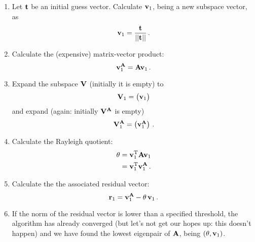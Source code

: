         \begin{enumerate}
            \item Let $\vb{t}$ be an initial guess vector. Calculate $\vb{v}_1$, being a new subspace vector, as
                \begin{equation}
                    \vb{v}_1 = \frac{\vb{t}}{|| \vb{t} ||} \thinspace .
                \end{equation}

            \item Calculate the (expensive) matrix-vector product:
                \begin{equation}
                    \vb{v}^{\vb{A}}_1 = \vb{A} \vb{v}_1 \thinspace .
                \end{equation}

            \item Expand the subspace $\vb{V}$ (initially it is empty) to
                \begin{equation}
                    \vb{V}_1 = \begin{pmatrix} \vb{v}_1 \end{pmatrix}
                \end{equation}
                and expand (again: initially $\vb{V}^{\vb{A}}$ is empty)
                \begin{equation}
                    \vb{V}^{\vb{A}}_1 = \begin{pmatrix} \vb{v}^{\vb{A}}_1 \end{pmatrix} \thinspace .
                \end{equation}

            \item Calculate the Rayleigh quotient:
                \begin{align}
                    \theta &= \vb{v}^{\text{T}}_1 \vb{A} \vb{v}_1 \\
                    &= \vb{v}^{\text{T}}_1 \vb{v}^{\vb{A}}_1 \thinspace .
                \end{align}

            \item Calculate the the associated residual vector:
                \begin{equation}
                    \vb{r}_1 = \vb{v}^{\vb{A}}_1 - \theta \thinspace \vb{v}_1 \thinspace .
                \end{equation}

            \item If the norm of the residual vector is lower than a specified threshold, the algorithm has already converged (but let's not get our hopes up: this doesn't happen) and we have found the lowest eigenpair of $\vb{A}$, being $(\theta, \vb{v}_1)$.


\end{enumerate}
